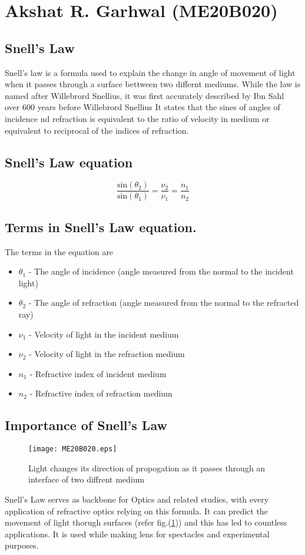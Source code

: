 \section{Akshat R. Garhwal (ME20B020)}
\subsection{Snell's Law}
Snell's law is a formula used to explain the change in angle of movement of light when it passes through a surface bettween two differnt mediums.
While the law is named after Willebrord Snellius, it was first accurately described by Ibn Sahl over 600 years before Willebrord Snellius
It states that the sines of angles of incidence nd refraction is equivalent to the ratio of velocity in medium or equivalent to reciprocal of the indices of refraction.
\subsection{Snell's Law equation}
\begin{equation}
	\frac {\text{sin}(\theta_{2})}{\text{sin}(\theta_{1})}  = \frac {\nu_{2}}{\nu_{1}} = {\frac  {n_{1}}{n_{2}}}
\end{equation}
\subsection{Terms in Snell's Law equation.}
The terms in the equation are 
\begin{itemize}
\item $\theta_{1}$ - The angle of incidence (angle measured from the normal to the incident light) 
\item $\theta_{2}$ - The angle of refraction (angle measured from the normal to the refracted ray)
\item $\nu_{1}$ - Velocity of light in the incident medium
\item $\nu_{2}$ - Velocity of light in the refraction medium
\item $n_{1}$ - Refractive index of incident medium
\item $n_{2}$ - Refractive index of refraction medium
\end{itemize}
\subsection{Importance of Snell's Law}
\begin{figure}[h]
\centering
\texttt{[image: ME20B020.eps]}
\caption{Light changes its direction of propogation as it passes through an interface of two diffrent medium}
\label{fig:lightpropogation}
\end{figure}
Snell's Law serves as backbone for Optics and related studies, with every application of refractive optics relying on this formula. It can predict the movement of light thorugh surfaces (refer fig.(\ref{fig:lightpropogation})) and this has led to countless applications. It is used while making lens for spectacles and experimental purposes. 